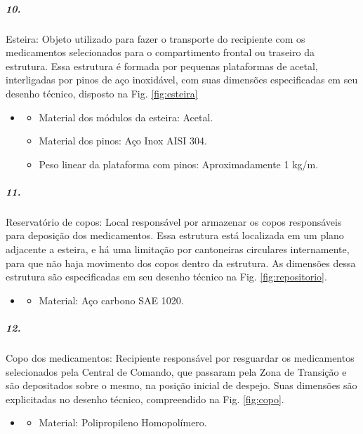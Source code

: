 \subparagraph*{10.}\label{retorno_esteira}
Esteira: Objeto utilizado para fazer o transporte do recipiente com os medicamentos selecionados para o compartimento frontal ou traseiro da estrutura. Essa estrutura é formada por pequenas plataformas de acetal, interligadas por pinos de aço inoxidável, com suas dimensões especificadas em seu desenho técnico, disposto na Fig. \ref{fig:esteira}


\begin{itemize}
    \item[]
    \begin{itemize}
    \item  Material dos módulos da esteira: Acetal.
    \item  Material dos pinos: Aço Inox AISI 304.
    \item  Peso linear da plataforma com pinos: Aproximadamente 1 kg/m.
    \end{itemize}
\end{itemize}   

\subparagraph*{11.}\label{retorno_reservatorio}
Reservatório de copos: Local responsável por armazenar os copos responsáveis para deposição dos medicamentos. Essa estrutura está localizada em um plano adjacente a esteira, e há uma limitação por cantoneiras circulares internamente, para que não haja movimento dos copos dentro da estrutura. As dimensões dessa estrutura são especificadas em seu desenho técnico na Fig. \ref{fig:repositorio}.

\begin{itemize}
   \item[]
   \begin{itemize}
       \item  Material: Aço carbono SAE 1020.
   \end{itemize}
   \end{itemize}
  

\subparagraph*{12.} \label{retorno_copo}
Copo dos medicamentos: Recipiente responsável por resguardar os medicamentos selecionados pela Central de Comando, que passaram pela Zona de Transição e são depositados sobre o mesmo, na posição inicial de despejo. Suas dimensões são explicitadas no desenho técnico, compreendido na Fig. \ref{fig:copo}.

\begin{itemize}
   \item[]
   \begin{itemize}
       \item Material: Polipropileno Homopolímero.
   \end{itemize}
   \end{itemize}


